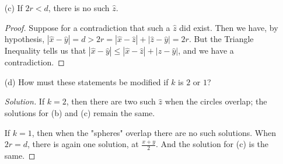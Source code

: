 \documentclass{article}
\newcommand{\abs}[1]{\left| #1 \right|}
\newcommand{\paren}[1]{\left( #1 \right)}
\newenvironment{solution}{\begin{proof}[Solution]}{\end{proof}}
\begin{document}
\begin{enumerate}
\begin{proof}
    but all $p_i^2 \ge 0$, so their sum can only be $0$ if all $p_i^2 = 0$, and thus all $p_i = 0$.

    Again, the calculation is similar for $\hat y$; the only difference is the sign of $\frac{d}{2}$, and it is squared afterward.

    Therefore $\hat p = \paren{0, \dots, 0}$ satisfies $\abs{\hat z - \hat x} = \abs{\hat z - \hat y} = r$; and it is the only point which could do so.



        
    \end{proof}



    \item[(c)] If $2r < d$, there is no such $\hat z$.

    \begin{proof}
        Suppose for a contradiction that such a $\hat z$ did exist. Then we have, by hypothesis, $\abs{\hat x - \hat y} = d > 2r = \abs{\hat x - \hat z} + \abs{\hat z - \hat y} = 2r$. But the Triangle Inequality tells us that $\abs{\hat x - \hat y} \le \abs{\hat x - \hat z} + \abs{\hat z - \hat y}$, and we have a contradiction.
    \end{proof}

    \item[(d)] How must these statements be modified if $k$ is $2$ or $1$?

    \begin{solution}
        If $k = 2$, then there are two such $\hat z$ when the circles overlap; the solutions for (b) and (c) remain the same.

        If $k = 1$, then when the "spheres" overlap there are no such solutions. When $2r = d$, there is again one solution, at $\frac{x + y}{2}$. And the solution for (c) is the same.
    \end{solution}
\end{enumerate}
\end{document}
